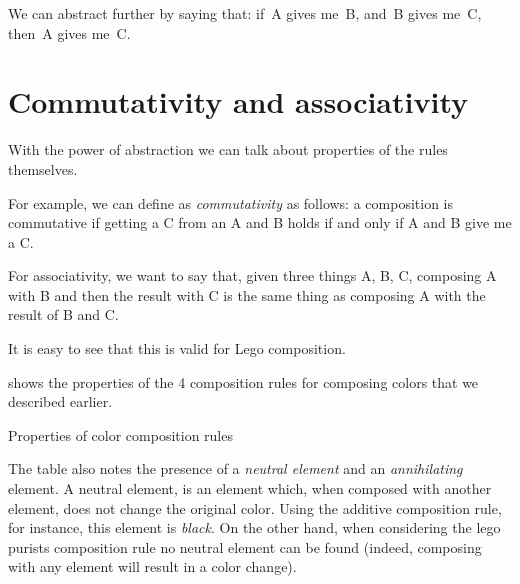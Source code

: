 

We can abstract further by saying that: if~A gives me~B, and~B gives me~C, then~A gives me~C.



\section{Commutativity and associativity}

With the power of abstraction we can talk about properties of the rules themselves.

For example, we can define as \emph{commutativity} as follows: a composition is commutative if getting a C from an A and B holds if and only if A and B give me a C.


For associativity, we want to say that, given three things A, B, C, composing A with B and then the result with C is the same thing as composing A with the result of B and C.


It is easy to see that this is valid for Lego composition.



 shows the properties of the 4 composition rules for composing colors that we described earlier.

\begin{table*}[p]
    \caption{Properties of color composition rules}
    \label{tab:color-properties}
\end{table*}

The table also notes the presence of a \emph{neutral element} and an \emph{annihilating} element.
A neutral element, is an element which, when composed with another element, does not change the original color.
Using the additive composition rule, for instance, this element is \emph{black}.
On the other hand, when considering the lego purists composition rule no neutral element can be found (indeed, composing with any element will result in a color change).


